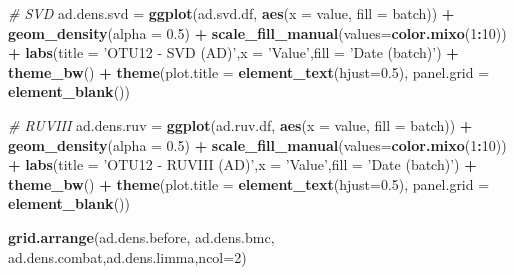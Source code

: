 \documentclass[]{book}
\newenvironment{Shaded}{\begin{snugshade}}{\end{snugshade}}
\newcommand{\KeywordTok}[1]{\textcolor[rgb]{0.13,0.29,0.53}{\textbf{#1}}}
\newcommand{\DataTypeTok}[1]{\textcolor[rgb]{0.13,0.29,0.53}{#1}}
\newcommand{\DecValTok}[1]{\textcolor[rgb]{0.00,0.00,0.81}{#1}}
\newcommand{\FloatTok}[1]{\textcolor[rgb]{0.00,0.00,0.81}{#1}}
\newcommand{\StringTok}[1]{\textcolor[rgb]{0.31,0.60,0.02}{#1}}
\newcommand{\CommentTok}[1]{\textcolor[rgb]{0.56,0.35,0.01}{\textit{#1}}}
\newcommand{\OperatorTok}[1]{\textcolor[rgb]{0.81,0.36,0.00}{\textbf{#1}}}
\newcommand{\NormalTok}[1]{#1}
\begin{document}
\begin{Shaded}
\begin{Highlighting}[]
\CommentTok{# SVD}
\NormalTok{ad.dens.svd =}\StringTok{ }\KeywordTok{ggplot}\NormalTok{(ad.svd.df, }\KeywordTok{aes}\NormalTok{(}\DataTypeTok{x =}\NormalTok{ value, }\DataTypeTok{fill =}\NormalTok{ batch)) }\OperatorTok{+}\StringTok{ }\KeywordTok{geom_density}\NormalTok{(}\DataTypeTok{alpha =} \FloatTok{0.5}\NormalTok{) }\OperatorTok{+}\StringTok{ }\KeywordTok{scale_fill_manual}\NormalTok{(}\DataTypeTok{values=}\KeywordTok{color.mixo}\NormalTok{(}\DecValTok{1}\OperatorTok{:}\DecValTok{10}\NormalTok{)) }\OperatorTok{+}\StringTok{ }\KeywordTok{labs}\NormalTok{(}\DataTypeTok{title =} \StringTok{'OTU12 - SVD (AD)'}\NormalTok{,}\DataTypeTok{x =} \StringTok{'Value'}\NormalTok{,}\DataTypeTok{fill =} \StringTok{'Date (batch)'}\NormalTok{) }\OperatorTok{+}\StringTok{ }\KeywordTok{theme_bw}\NormalTok{() }\OperatorTok{+}\StringTok{ }\KeywordTok{theme}\NormalTok{(}\DataTypeTok{plot.title =} \KeywordTok{element_text}\NormalTok{(}\DataTypeTok{hjust=}\FloatTok{0.5}\NormalTok{), }\DataTypeTok{panel.grid =} \KeywordTok{element_blank}\NormalTok{())}


\CommentTok{# RUVIII}
\NormalTok{ad.dens.ruv =}\StringTok{ }\KeywordTok{ggplot}\NormalTok{(ad.ruv.df, }\KeywordTok{aes}\NormalTok{(}\DataTypeTok{x =}\NormalTok{ value, }\DataTypeTok{fill =}\NormalTok{ batch)) }\OperatorTok{+}\StringTok{ }\KeywordTok{geom_density}\NormalTok{(}\DataTypeTok{alpha =} \FloatTok{0.5}\NormalTok{) }\OperatorTok{+}\StringTok{ }\KeywordTok{scale_fill_manual}\NormalTok{(}\DataTypeTok{values=}\KeywordTok{color.mixo}\NormalTok{(}\DecValTok{1}\OperatorTok{:}\DecValTok{10}\NormalTok{)) }\OperatorTok{+}\StringTok{ }\KeywordTok{labs}\NormalTok{(}\DataTypeTok{title =} \StringTok{'OTU12 - RUVIII (AD)'}\NormalTok{,}\DataTypeTok{x =} \StringTok{'Value'}\NormalTok{,}\DataTypeTok{fill =} \StringTok{'Date (batch)'}\NormalTok{) }\OperatorTok{+}\StringTok{ }\KeywordTok{theme_bw}\NormalTok{() }\OperatorTok{+}\StringTok{ }\KeywordTok{theme}\NormalTok{(}\DataTypeTok{plot.title =} \KeywordTok{element_text}\NormalTok{(}\DataTypeTok{hjust=}\FloatTok{0.5}\NormalTok{), }\DataTypeTok{panel.grid =} \KeywordTok{element_blank}\NormalTok{())}
\end{Highlighting}
\end{Shaded}

\begin{Shaded}
\begin{Highlighting}[]
\KeywordTok{grid.arrange}\NormalTok{(ad.dens.before, ad.dens.bmc, ad.dens.combat,ad.dens.limma,}\DataTypeTok{ncol=}\DecValTok{2}\NormalTok{)}
\end{Highlighting}
\end{Shaded}
\end{document}
